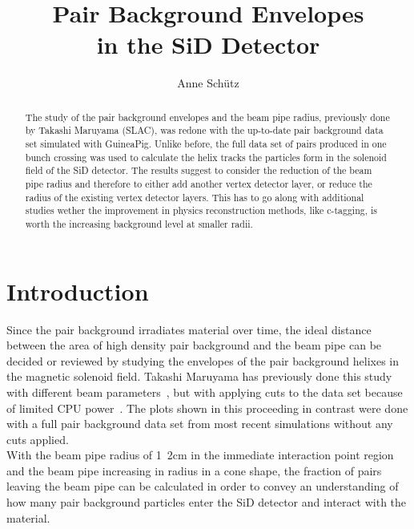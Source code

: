 \documentclass[12pt]{article}
\newcommand{\guineapig}{GuineaPig\xspace}
\begin{document}

\title{Pair Background Envelopes\\in the SiD Detector}

\author[1,2]{Anne Sch\"utz}


\maketitle

\linenumbers

\begin{abstract}
The study of the pair background envelopes and the beam pipe radius, previously done by Takashi Maruyama (SLAC), was redone with the up-to-date pair background data set simulated with \guineapig.
Unlike before, the full data set of pairs produced in one bunch crossing was used to calculate the helix tracks the particles form in the solenoid field of the SiD detector.
The results suggest to consider the reduction of the beam pipe radius and therefore to either add another vertex detector layer, or reduce the radius of the existing vertex detector layers.
This has to go along with additional studies wether the improvement in physics reconstruction methods, like c-tagging, is worth the increasing background level at smaller radii.
\end{abstract}


\section{Introduction}
\label{sec:introduction}
Since the pair background irradiates material over time, the ideal distance between the area of high density pair background and the beam pipe can be decided or reviewed by studying the envelopes of the pair background helixes in the magnetic solenoid field.
Takashi Maruyama has previously done this study with different beam parameters~\cite{Takashi_plot}, but with applying cuts to the data set because of limited CPU power~\cite{Takashi}.
The plots shown in this proceeding in contrast were done with a full pair background data set from most recent simulations without any cuts applied.\\
With the beam pipe radius of \unit{1.2}{cm} in the immediate interaction point region and the beam pipe increasing in radius in a cone shape, the fraction of pairs leaving the beam pipe can be calculated in order to convey an understanding of how many pair background particles enter the SiD detector and interact with the material. 
\end{document}
